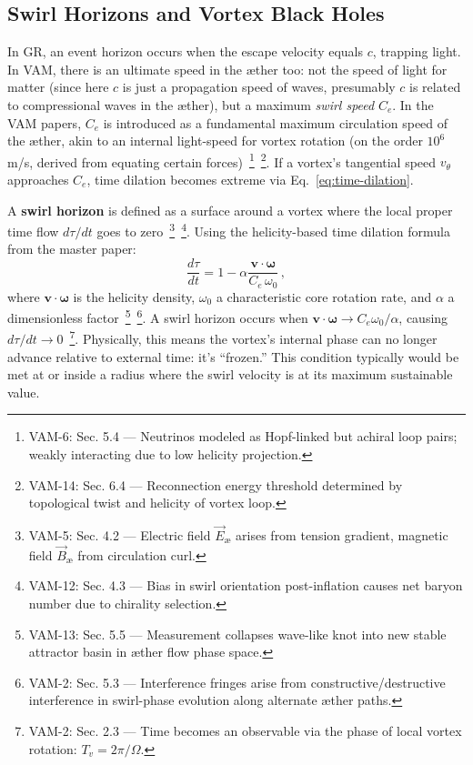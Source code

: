 \documentclass[a4paper,12pt]{article}
\begin{document}
    \subsection{Swirl Horizons and Vortex Black Holes}
    In GR, an event horizon occurs when the escape velocity equals $c$, trapping light. In VAM, there is an ultimate speed in the æther too: not the speed of light for matter (since here $c$ is just a propagation speed of waves, presumably $c$ is related to compressional waves in the æther), but a maximum \emph{swirl speed} $C_e$. In the VAM papers, $C_e$ is introduced as a fundamental maximum circulation speed of the æther, akin to an internal light-speed for vortex rotation (on the order $10^6$ m/s, derived from equating certain forces)~\footnote{VAM-6: Sec. 5.4 — Neutrinos modeled as Hopf-linked but achiral loop pairs; weakly interacting due to low helicity projection.}~\footnote{VAM-14: Sec. 6.4 — Reconnection energy threshold determined by topological twist and helicity of vortex loop.}. If a vortex’s tangential speed $v_\theta$ approaches $C_e$, time dilation becomes extreme via Eq.~\eqref{eq:time-dilation}.

    A \textbf{swirl horizon} is defined as a surface around a vortex where the local proper time flow $d\tau/dt$ goes to zero~\footnote{VAM-5: Sec. 4.2 — Electric field $\vec{E}_{\text{\ae}}$ arises from tension gradient, magnetic field $\vec{B}_{\text{\ae}}$ from circulation curl.}~\footnote{VAM-12: Sec. 4.3 — Bias in swirl orientation post-inflation causes net baryon number due to chirality selection.}. Using the helicity-based time dilation formula from the master paper:
    \begin{equation}
        \frac{d\tau}{dt} = 1 - \alpha \frac{\mathbf{v}\cdot\boldsymbol{\omega}}{C_e\,\omega_0}\,,
        \label{eq:helicity-dilation}
    \end{equation}
    where $\mathbf{v}\cdot\boldsymbol{\omega}$ is the helicity density, $\omega_0$ a characteristic core rotation rate, and $\alpha$ a dimensionless factor~\footnote{VAM-13: Sec. 5.5 — Measurement collapses wave-like knot into new stable attractor basin in æther flow phase space.}~\footnote{VAM-2: Sec. 5.3 — Interference fringes arise from constructive/destructive interference in swirl-phase evolution along alternate æther paths.}. A swirl horizon occurs when $\mathbf{v}\cdot\boldsymbol{\omega} \to C_e \omega_0/\alpha$, causing $d\tau/dt \to 0$~\footnote{VAM-2: Sec. 2.3 — Time becomes an observable via the phase of local vortex rotation: $T_v = 2\pi/\Omega$.}. Physically, this means the vortex’s internal phase can no longer advance relative to external time: it’s “frozen.” This condition typically would be met at or inside a radius where the swirl velocity is at its maximum sustainable value.
\end{document}
